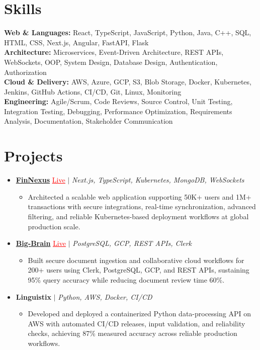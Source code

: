 \documentclass[letterpaper,10pt]{article}
\newcommand{\itemTail}{\vspace{-4pt}}
\newcommand{\sectionGap}{\vspace{-8pt}}
\newcommand{\projGap}{\vspace{3pt}}
\newcommand{\resumeItem}[1]{\item\small{{#1 \itemTail}}}
\newcommand{\resumeProjectHeading}[1]{\item \small #1 \vspace{-2pt}}
\newcommand{\resumeProjectLink}[2]{\href{#1}{\textcolor{red}{\underline{#2}}}}
\newcommand{\resumeSubHeadingListStart}{\begin{itemize}[leftmargin=0.0in, label={}]}
\newcommand{\resumeSubHeadingListEnd}{\end{itemize}}
\newcommand{\resumeProjItemListStart}{\begin{itemize}[leftmargin=0.15in,label=\textbullet,itemsep=3pt,topsep=0pt,parsep=0pt,partopsep=0pt]}
\newcommand{\resumeProjItemListEnd}{\end{itemize}\vspace{-4pt}}
\begin{document}
\section{Skills}
\begin{itemize}[leftmargin=0.15in, label={}]
\small{\item{
\textbf{Web \& Languages:} React, TypeScript, JavaScript, Python, Java, C++, SQL, HTML, CSS, Next.js, Angular, FastAPI, Flask \\
\textbf{Architecture:} Microservices, Event-Driven Architecture, REST APIs, WebSockets, OOP, System Design, Database Design, Authentication, Authorization \\
\textbf{Cloud \& Delivery:} AWS, Azure, GCP, S3, Blob Storage, Docker, Kubernetes, Jenkins, GitHub Actions, CI/CD, Git, Linux, Monitoring \\
\textbf{Engineering:} Agile/Scrum, Code Reviews, Source Control, Unit Testing, Integration Testing, Debugging, Performance Optimization, Requirements Analysis, Documentation, Stakeholder Communication
}}
\end{itemize}
\sectionGap
\section{Projects}
\resumeSubHeadingListStart
\vspace{-2pt}
\resumeProjectHeading{\href{https://fin-nexus.vercel.app/}{\textbf{FinNexus}} \resumeProjectLink{https://fin-nexus.vercel.app/}{Live} $|$ \emph{Next.js, TypeScript, Kubernetes, MongoDB, WebSockets}}
\resumeProjItemListStart
\resumeItem{Architected a scalable web application supporting 50K+ users and 1M+ transactions with secure integrations, real-time synchronization, advanced filtering, and reliable Kubernetes-based deployment workflows at global production scale.}
\resumeProjItemListEnd
\projGap
\resumeProjectHeading{\href{https://big-brain-pied.vercel.app/}{\textbf{Big-Brain}} \resumeProjectLink{https://big-brain-pied.vercel.app/}{Live} $|$ \emph{PostgreSQL, GCP, REST APIs, Clerk}}
\resumeProjItemListStart
\resumeItem{Built secure document ingestion and collaborative cloud workflows for 200+ users using Clerk, PostgreSQL, GCP, and REST APIs, sustaining 95\% query accuracy while reducing document review time 60\%.}
\resumeProjItemListEnd
\projGap
\resumeProjectHeading{\textbf{Linguistix} $|$ \emph{Python, AWS, Docker, CI/CD}}
\resumeProjItemListStart
\resumeItem{Developed and deployed a containerized Python data-processing API on AWS with automated CI/CD releases, input validation, and reliability checks, achieving 87\% measured accuracy across reliable production workflows.}
\resumeProjItemListEnd
\resumeSubHeadingListEnd
\end{document}

